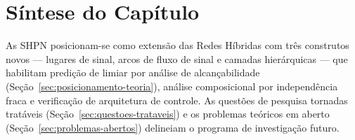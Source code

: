 \section{Síntese do Capítulo}
\label{sec:sintese-discussao}

As SHPN posicionam-se como extensão das Redes Híbridas com três construtos
novos --- lugares de sinal, arcos de fluxo de sinal e camadas hierárquicas ---
que habilitam predição de limiar por análise de alcançabilidade
(Seção~\ref{sec:posicionamento-teoria}), análise composicional por independência
fraca e verificação de arquitetura de controle.
As questões de pesquisa tornadas tratáveis
(Seção~\ref{sec:questoes-trataveis}) e os problemas teóricos em aberto
(Seção~\ref{sec:problemas-abertos}) delineiam o programa de investigação
futuro.
